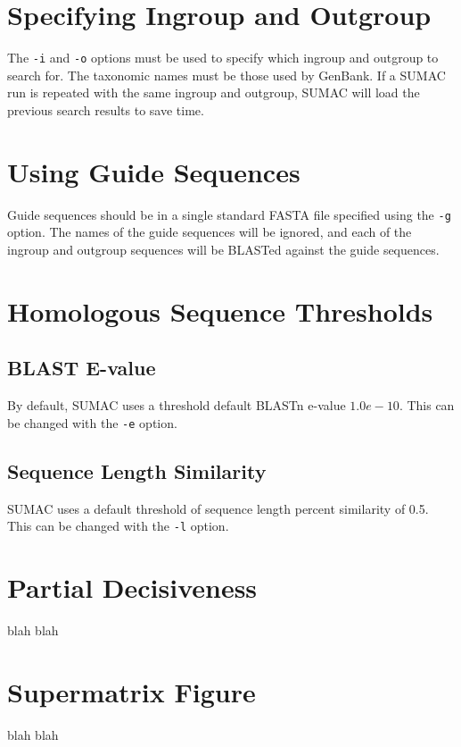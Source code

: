 \documentclass[10pt]{report}
\begin{document}
\section{Specifying Ingroup and Outgroup}

The \verb|-i| and \verb|-o| options must be used to specify which ingroup and
outgroup to search for. The taxonomic names must be those used by GenBank.
If a SUMAC run is repeated with the same ingroup and outgroup, SUMAC
will load the previous search results to save time.

\section{Using Guide Sequences}

Guide sequences should be in a single standard FASTA file specified
using the \verb|-g| option. The names of the
guide sequences will be ignored, and each of the ingroup and outgroup 
sequences will be BLASTed against the guide sequences.

\section{Homologous Sequence Thresholds}

\subsection{BLAST E-value}
By default, SUMAC uses a threshold default BLASTn e-value $1.0e-10$.
This can be changed with the \verb|-e| option.

\subsection{Sequence Length Similarity}
SUMAC uses a default threshold of sequence length percent similarity
of 0.5. This can be changed with the \verb|-l| option.

\section{Partial Decisiveness}
blah blah

\section{Supermatrix Figure}
blah blah
\end{document}
